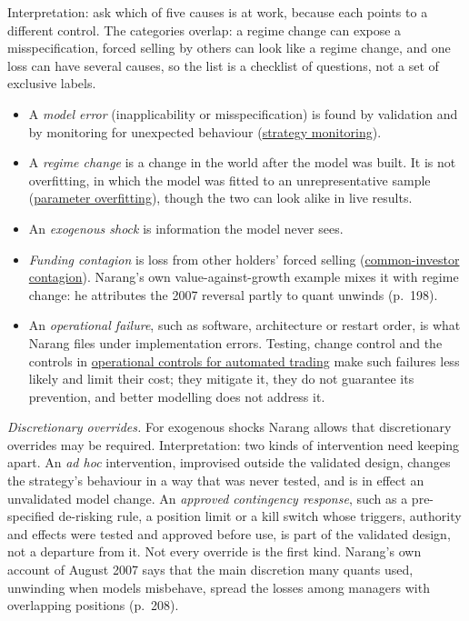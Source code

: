 \begin{qfdefinition}
 Interpretation: ask which of five causes is at work, because each points to a different control. The categories overlap: a regime change can expose a misspecification, forced selling by others can look like a regime change, and one loss can have several causes, so the list is a checklist of questions, not a set of exclusive labels.
\begin{itemize}
\item A \emph{model error} (inapplicability or misspecification) is found by validation and by monitoring for unexpected behaviour (\hyperref[meth:quant-strategy-monitoring]{strategy monitoring}).
\item A \emph{regime change} is a change in the world after the model was built. It is not overfitting, in which the model was fitted to an unrepresentative sample (\hyperref[pit:parameter-overfitting]{parameter overfitting}), though the two can look alike in live results.
\item An \emph{exogenous shock} is information the model never sees.
\item \emph{Funding contagion} is loss from other holders' forced selling (\hyperref[def:common-investor-contagion]{common-investor contagion}). Narang's own value-against-growth example mixes it with regime change: he attributes the 2007 reversal partly to quant unwinds (p.~198).
\item An \emph{operational failure}, such as software, architecture or restart order, is what Narang files under implementation errors. Testing, change control and the controls in \hyperref[meth:automated-trading-operational-controls]{operational controls for automated trading} make such failures less likely and limit their cost; they mitigate it, they do not guarantee its prevention, and better modelling does not address it.
\end{itemize}

 \emph{Discretionary overrides.} For exogenous shocks Narang allows that discretionary overrides may be required. Interpretation: two kinds of intervention need keeping apart. An \emph{ad hoc} intervention, improvised outside the validated design, changes the strategy's behaviour in a way that was never tested, and is in effect an unvalidated model change. An \emph{approved contingency response}, such as a pre-specified de-risking rule, a position limit or a kill switch whose triggers, authority and effects were tested and approved before use, is part of the validated design, not a departure from it. Not every override is the first kind. Narang's own account of August 2007 says that the main discretion many quants used, unwinding when models misbehave, spread the losses among managers with overlapping positions (p.~208).


\end{qfdefinition}
